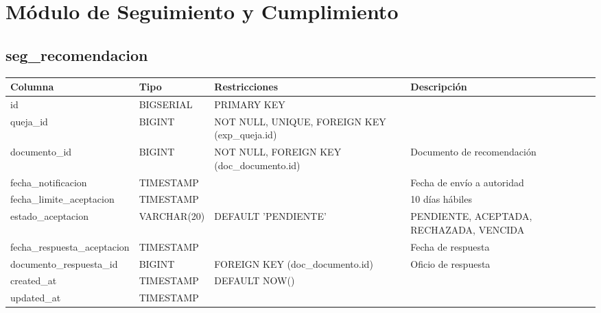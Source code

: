 \documentclass[12pt, a4paper]{article}
\begin{document}
\section{Módulo de Seguimiento y Cumplimiento}
\label{sec:seguimiento}

\subsection{seg\_recomendacion}
\begin{longtable}{|p{3.5cm}|p{2.5cm}|p{3cm}|p{5cm}|}
    \hline
    \rowcolor[gray]{0.9}
    \textbf{Columna} & \textbf{Tipo} & \textbf{Restricciones} & \textbf{Descripción} \\
    \hline
    id & BIGSERIAL & PRIMARY KEY & \\
    \hline
    queja\_id & BIGINT & NOT NULL, UNIQUE, FOREIGN KEY (exp\_queja.id) & \\
    \hline
    documento\_id & BIGINT & NOT NULL, FOREIGN KEY (doc\_documento.id) & Documento de recomendación \\
    \hline
    fecha\_notificacion & TIMESTAMP & & Fecha de envío a autoridad \\
    \hline
    fecha\_limite\_aceptacion & TIMESTAMP & & 10 días hábiles \\
    \hline
    estado\_aceptacion & VARCHAR(20) & DEFAULT 'PENDIENTE' & PENDIENTE, ACEPTADA, RECHAZADA, VENCIDA \\
    \hline
    fecha\_respuesta\_aceptacion & TIMESTAMP & & Fecha de respuesta \\
    \hline
    documento\_respuesta\_id & BIGINT & FOREIGN KEY (doc\_documento.id) & Oficio de respuesta \\
    \hline
    created\_at & TIMESTAMP & DEFAULT NOW() & \\
    \hline
    updated\_at & TIMESTAMP & & \\
    \hline
\end{longtable}
\end{document}
